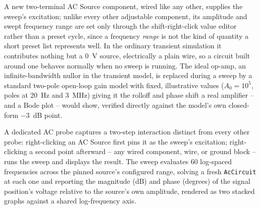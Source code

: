 A new two-terminal AC Source component, wired like any other, supplies the sweep's
excitation; unlike every other adjustable component, its amplitude and swept frequency range
are set only through the shift-right-click value editor rather than a preset cycle, since a
frequency \emph{range} is not the kind of quantity a short preset list represents well. In
the ordinary transient simulation it contributes nothing but a 0~V source, electrically a
plain wire, so a circuit built around one behaves normally when no sweep is running. The
ideal op-amp, an infinite-bandwidth nullor in the transient model, is replaced during a sweep
by a standard two-pole open-loop gain model with fixed, illustrative values ($A_0=10^5$,
poles at 20~Hz and 3~MHz) giving it the rolloff and phase shift a real amplifier -- and a
Bode plot -- would show, verified directly against the model's own closed-form $-3$~dB point.

A dedicated AC probe captures a two-step interaction distinct from every other probe:
right-clicking an AC Source first pins it as the sweep's excitation; right-clicking a second
point afterward -- any wired component, wire, or ground block -- runs the sweep and displays
the result. The sweep evaluates 60 log-spaced frequencies across the pinned source's
configured range, solving a fresh \texttt{AcCircuit} at each one and reporting the magnitude
(dB) and phase (degrees) of the signal position's voltage relative to the source's own
amplitude, rendered as two stacked graphs against a shared log-frequency axis.
